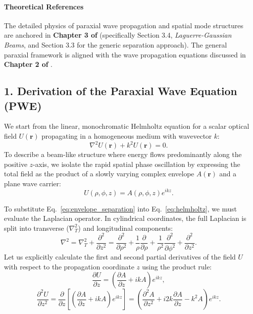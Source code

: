 \begin{resolucao}[Solution]

    \paragraph*{Theoretical References}
    The detailed physics of paraxial wave propagation and spatial mode structures are anchored in \textbf{Chapter 3 of } (specifically Section 3.4, \textit{Laguerre-Gaussian Beams}, and Section 3.3 for the generic separation approach). The general paraxial framework is aligned with the wave propagation equations discussed in \textbf{Chapter 2 of }.

    \subsection*{1. Derivation of the Paraxial Wave Equation (PWE)}

        We start from the linear, monochromatic Helmholtz equation for a scalar optical field $U(\mathbf{r})$ propagating in a homogeneous medium with wavevector $k$:
        \begin{equation}
            \nabla^2 U(\mathbf{r}) + k^2 U(\mathbf{r}) = 0.
            \label{eq:helmholtz}
        \end{equation}
        To describe a beam-like structure where energy flows predominantly along the positive $z$-axis, we isolate the rapid spatial phase oscillation by expressing the total field as the product of a slowly varying complex envelope $A(\mathbf{r})$ and a plane wave carrier:
        \begin{equation}
            U(\rho, \phi, z) = A(\rho, \phi, z) e^{i k z}.
            \label{eq:envelope_separation}
        \end{equation}
        
        To substitute Eq.~\eqref{eq:envelope_separation} into Eq.~\eqref{eq:helmholtz}, we must evaluate the Laplacian operator. In cylindrical coordinates, the full Laplacian is split into transverse ($\nabla_T^2$) and longitudinal components:
        \[
        \nabla^2 = \nabla_T^2 + \frac{\partial^2}{\partial z^2} = \frac{\partial^2}{\partial \rho^2} + \frac{1}{\rho}\frac{\partial}{\partial \rho} + \frac{1}{\rho^2}\frac{\partial^2}{\partial \phi^2} + \frac{\partial^2}{\partial z^2}.
        \]
        Let us explicitly calculate the first and second partial derivatives of the field $U$ with respect to the propagation coordinate $z$ using the product rule:
        \[
        \frac{\partial U}{\partial z} = \left( \frac{\partial A}{\partial z} + i k A \right) e^{i k z},
        \]
        \begin{equation}
            \frac{\partial^2 U}{\partial z^2} = \frac{\partial}{\partial z} \left[ \left( \frac{\partial A}{\partial z} + i k A \right) e^{i k z} \right] = \left( \frac{\partial^2 A}{\partial z^2} + i 2k \frac{\partial A}{\partial z} - k^2 A \right) e^{i k z}.
            \label{eq:z_derivatives}
        \end{equation}
        

\end{resolucao}
